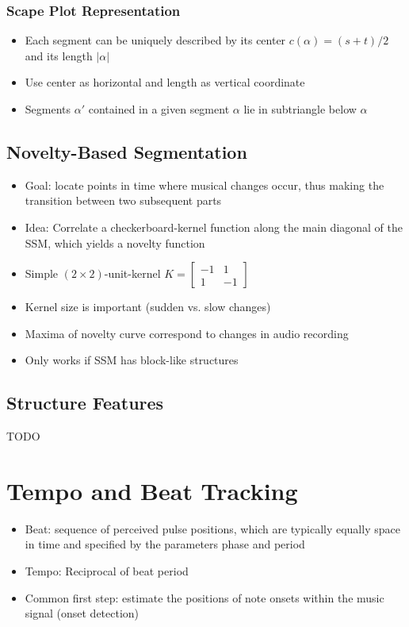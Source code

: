 \documentclass{scrartcl}
\begin{document}
\subsubsection*{Scape Plot Representation}
\begin{itemize}
    \item
        Each segment can be uniquely described by its center $c(\alpha) = (s+t)/2$ and its length $|\alpha|$
    \item
        Use center as horizontal and length as vertical coordinate
    \item
        Segments $\alpha'$ contained in a given segment $\alpha$ lie in subtriangle below $\alpha$
\end{itemize}

\subsection{Novelty-Based Segmentation}
\begin{itemize}
    \item
        Goal: locate points in time where musical changes occur, thus making the transition between two subsequent parts
    \item
        Idea: Correlate a checkerboard-kernel function along the main diagonal of the SSM, which yields a novelty function
    \item
        Simple $(2 \times 2)$-unit-kernel $K = \begin{bmatrix} -1 & 1 \\ 1 & -1 \end{bmatrix}$
    \item
        Kernel size is important (sudden vs. slow changes)
    \item
        Maxima of novelty curve correspond to changes in audio recording
    \item
        Only works if SSM has block-like structures
\end{itemize}

\subsection{Structure Features}
TODO

\newpage

\section*{Tempo and Beat Tracking}
\begin{itemize}
    \item
	Beat: sequence of perceived pulse positions, which are typically equally space in time and specified by the parameters phase and period
    \item
	Tempo: Reciprocal of beat period
    \item
	Common first step: estimate the positions of note onsets within the music signal (onset detection)
\end{itemize}
\end{document}
